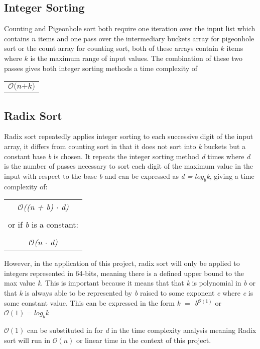 \documentclass[12pt]{article}
\begin{document}
	\subsection{Integer Sorting}
	Counting and Pigeonhole sort both require one iteration over the input list which contains $n$ items and one pass over the intermediary buckets array for pigeonhole sort or the count array for counting sort, both of these arrays contain $k$ items where $k$ is the maximum range of input values. The combination of these two passes gives both integer sorting methods a time complexity of 
	\begin{table}[!h]
		\begin{center}
			\begin{tabular}{c}
				$\mathcal{O}\textit{(n+k)}$ 
			\end{tabular}				
			\end{center}
		\end{table}
	\subsection{Radix Sort}
	Radix sort repeatedly applies integer sorting to each successive digit of the input array, it differs from counting sort in that it does not sort into \textit{k} buckets but a constant base \textit{b} is chosen. It repeats the integer sorting method \textit{d} times where \textit{d} is the number of passes necessary to sort each digit of the maximum value in the input with respect to the base \textit{b} and can be expressed as \textit{d = $log_b$k}, giving a time complexity of:
	\begin{table}[!h]
		\begin{center}
			\begin{tabular}{c}

	 $\mathcal{O}$\textit{((n + b) $\cdot$ d)}
 \\ \\
	or if \textit{b} is a constant:
\\	\\
	$\mathcal{O}$\textit{(n $\cdot$ d)} 
			\end{tabular}
				
			\end{center}
		\end{table}
			
	However, in the application of this project, radix sort will only be applied to integers represented in 64-bits, meaning there is a defined upper bound to the max value \textit{k}. This is important because it means that that \textit{k} is polynomial in \textit{b} or that \textit{k} is always able to be represented by \textit{b} raised to some exponent \textit{c} where \textit{c} is some constant value. This can be expressed in the form \textit{k $=$ b$^{\mathcal{O}(1)}$} or \textit{$\mathcal{O}(1) = log_b$k}
	\par
	$\mathcal{O}(1)$ can be substituted in for \textit{d} in the time complexity analysis meaning Radix sort will run in $\mathcal{O}(n)$ or linear time in the context of this project.
	\pagebreak
\end{document}
